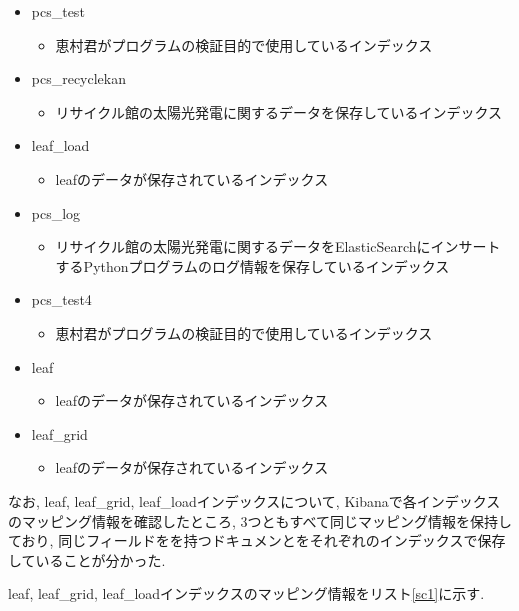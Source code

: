 \documentclass[a4j,12pt,]{jarticle}
\begin{document}
\begin{itemize}
  \item pcs\_test
  \begin{itemize}
    \item 恵村君がプログラムの検証目的で使用しているインデックス
  \end{itemize}
  \item pcs\_recyclekan
  \begin{itemize}
    \item リサイクル館の太陽光発電に関するデータを保存しているインデックス
  \end{itemize}
  \item leaf\_load
  \begin{itemize}
    \item leafのデータが保存されているインデックス
  \end{itemize}
  \item pcs\_log
  \begin{itemize}
    \item リサイクル館の太陽光発電に関するデータをElasticSearchにインサートするPythonプログラムのログ情報を保存しているインデックス
  \end{itemize}
  \item pcs\_test4
  \begin{itemize}
    \item 恵村君がプログラムの検証目的で使用しているインデックス
  \end{itemize}
  \item leaf
  \begin{itemize}
    \item leafのデータが保存されているインデックス
  \end{itemize}
  \item leaf\_grid
  \begin{itemize}
    \item leafのデータが保存されているインデックス
  \end{itemize}
\end{itemize}

なお, leaf, leaf\_grid, leaf\_loadインデックスについて, Kibanaで各インデックスのマッピング情報を確認したところ, 3つともすべて同じマッピング情報を保持しており, 同じフィールドをを持つドキュメンとをそれぞれのインデックスで保存していることが分かった.

leaf, leaf\_grid, leaf\_loadインデックスのマッピング情報をリスト\ref{sc1}に示す.
\end{document}
